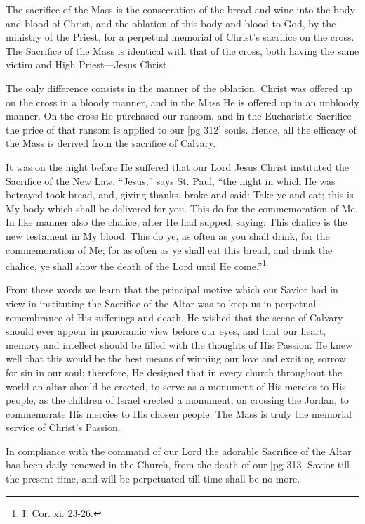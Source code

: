 The sacrifice of the Mass is the consecration of
the bread and wine into the body and blood of
Christ, and the oblation of this body and blood to
God, by the ministry of the Priest, for a perpetual
memorial of Christ's sacrifice on the cross. The
Sacrifice of the Mass is identical with that of the
cross, both having the same victim and High
Priest—Jesus Christ.

The only difference consists in the manner of
the oblation. Christ was offered up on the cross
in a bloody manner, and in the Mass He is offered
up in an unbloody manner. On the cross He purchased
our ransom, and in the Eucharistic Sacrifice
the price of that ransom is applied to our
[pg 312]
souls. Hence, all the efficacy of the Mass is derived
from the sacrifice of Calvary.

It was on the night before He suffered that our
Lord Jesus Christ instituted the Sacrifice of the
New Law. “Jesus,” says St. Paul, “the night in
which He was betrayed took bread, and, giving
thanks, broke and said: Take ye and eat; this is
My body which shall be delivered for you. This
do for the commemoration of Me. In like manner
also the chalice, after He had supped, saying:
This chalice is the new testament in My blood.
This do ye, as often as you shall drink, for the commemoration
of Me; for as often as ye shall eat this
bread, and drink the chalice, ye shall show the
death of the Lord until He come.”\footnote{I. Cor. xi. 23-26.}

From these words we learn that the principal
motive which our Savior had in view in instituting
the Sacrifice of the Altar was to keep us in perpetual
remembrance of His sufferings and death.
He wished that the scene of Calvary should ever appear
in panoramic view before our eyes, and that
our heart, memory and intellect should be filled
with the thoughts of His Passion. He knew well
that this would be the best means of winning our
love and exciting sorrow for sin in our soul;
therefore, He designed that in every church
throughout the world an altar should be erected,
to serve as a monument of His mercies to His
people, as the children of Israel erected a monument,
on crossing the Jordan, to commemorate
His mercies to His chosen people. The Mass is
truly the memorial service of Christ's Passion.

In compliance with the command of our Lord
the adorable Sacrifice of the Altar has been daily
renewed in the Church, from the death of our
[pg 313]
Savior till the present time, and will be perpetuated
till time shall be no more.

